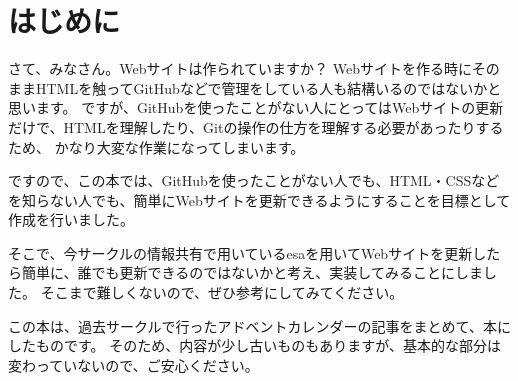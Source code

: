 \chapter{はじめに}

さて、みなさん。Webサイトは作られていますか？
Webサイトを作る時にそのままHTMLを触ってGitHubなどで管理をしている人も結構いるのではないかと思います。
ですが、GitHubを使ったことがない人にとってはWebサイトの更新だけで、HTMLを理解したり、Gitの操作の仕方を理解する必要があったりするため、
かなり大変な作業になってしまいます。

ですので、この本では、GitHubを使ったことがない人でも、HTML・CSSなどを知らない人でも、簡単にWebサイトを更新できるようにすることを目標として作成を行いました。

そこで、今サークルの情報共有で用いているesaを用いてWebサイトを更新したら簡単に、誰でも更新できるのではないかと考え、実装してみることにしました。
そこまで難しくないので、ぜひ参考にしてみてください。

この本は、過去サークルで行ったアドベントカレンダーの記事をまとめて、本にしたものです。
そのため、内容が少し古いものもありますが、基本的な部分は変わっていないので、ご安心ください。